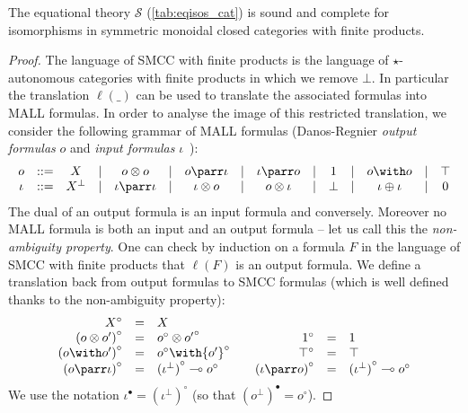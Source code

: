 \documentclass{lmcs}
\newcommand*{\orth}{^\perp} %
\newcommand*{\tens}{\otimes} %
\newcommand*{\lolipop}{\multimap} %
\newcommand*{\thS}{\mathcal{S}}
\newcommand*{\iform}{\iota}
\newcommand*{\tradm}[1]{\ell(#1)}
\newcommand*{\tradi}[1]{{#1}^\bullet}
\newcommand*{\bigtradi}[1]{\tradi{(#1)}}
\newcommand*{\trado}[1]{{#1}^\circ}
\newcommand*{\bigtrado}[1]{\trado{(#1)}}
\newcommand{\coloncoloneqq}{\mathrel{::=}}
\begin{document}
\begin{thm}\label{thm:isos_smcc}
The equational theory $\thS$ (\autoref{tab:eqisos_cat}) is sound and complete for isomorphisms in symmetric monoidal closed categories with finite products.
\end{thm}
\begin{proof}
The language of SMCC with finite products is the language of $\star$-autonomous categories with finite products in which we remove $\bot$.
In particular the translation $\tradm{\_}$ can be used to translate the associated formulas into MALL formulas.
In order to analyse the image of this restricted translation, we consider the following grammar of MALL formulas (Danos-Regnier \emph{output formulas} $o$ and \emph{input formulas} $\iform$~\cite{lamarchegames}):
\begin{equation*}
\begin{array}{ccccccccccccccc}
  o & \coloncoloneqq & X & \mid & o\tens o & \mid & o\parr\iform & \mid & \iform\parr o & \mid & 1 & \mid & o\with o & \mid & \top \\
  \iform & \coloncoloneqq & X\orth & \mid & \iform\parr\iform & \mid & \iform\tens o & \mid & o\tens\iform & \mid & \bot & \mid & \iform\oplus\iform & \mid & 0
\end{array}
\end{equation*}
The dual of an output formula is an input formula and conversely.
Moreover no MALL formula is both an input and an output formula -- let us call this the \emph{non-ambiguity property}.
One can check by induction on a formula $F$ in the language of SMCC with finite products that $\tradm{F}$ is an output formula.
We define a translation back from output formulas to SMCC formulas (which is well defined thanks to the non-ambiguity property):
\begin{equation*}
  \begin{array}{rcl@{\qquad}rcl}
    \trado{X} & = & X \\
    \bigtrado{o\tens o'} & = & \trado{o}\tens\trado{o'} &\trado{1} & = & 1 \\
     \bigtrado{o\with o'} & = & \trado{o}\with\trado{o'} & \trado{\top} & = & \top \\
   \bigtrado{o\parr\iform} & = & \bigtrado{\iform\orth}\lolipop\trado{o} &
      \bigtrado{\iform\parr o} & = & \bigtrado{\iform\orth}\lolipop\trado{o}
  \end{array}
\end{equation*}
We use the notation $\tradi{\iform}=\bigtrado{\iform\orth}$ (so that $\bigtradi{o\orth}=\trado{o}$).

\end{proof}
\end{document}

